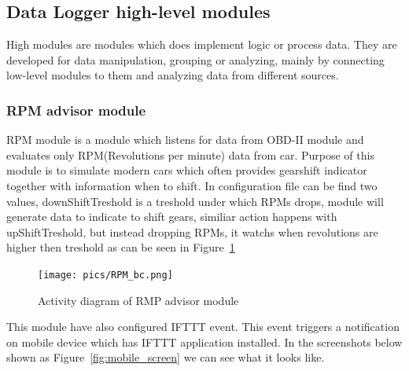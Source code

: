 \subsection{Data Logger high-level modules}

High modules are modules which does implement logic or process data. They are developed for data manipulation, grouping or analyzing, mainly by connecting low-level modules to them and analyzing data from different sources.
\subsubsection{RPM advisor module} %
\label{ssub:rpm_module}
RPM module is a module which listens for data from OBD-II module and evaluates only RPM(Revolutions per minute) data from car. Purpose of this module is to simulate modern cars which often provides gearshift indicator together with information when to shift. In configuration file can be find two values, downShiftTreshold is a treshold under which RPMs drops, module will generate data to indicate to shift gears, similiar action happens with upShiftTreshold, but instead dropping RPMs, it watchs when revolutions are higher then treshold as can be seen in Figure~\ref{fig:rmp_pic} 
\begin{figure}[H]
\begin{center}
\captionsetup{font=small}
\texttt{[image: pics/RPM\_bc.png]}
\caption{Activity diagram of RMP advisor module}
\label{fig:rmp_pic}
\end{center}
\end{figure}
This module have also configured IFTTT event. This event triggers a notification on mobile device which has IFTTT application installed. In the screenshots below shown as Figure~\ref{fig:mobile_screen} we can see what it looks like.
